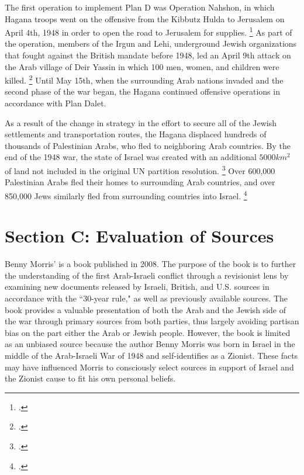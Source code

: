 \documentclass[12pt]{turabian-researchpaper}
\begin{document}
The first operation to implement Plan D was Operation Nahshon, in which Hagana troops went on the offensive from the Kibbutz Hulda to Jerusalem on April 4th, 1948 in order to open the road to Jerusalem for supplies.
\footcite[][121]{morris}
As part of the operation, members of the Irgun and Lehi, underground Jewish organizations that fought against the British mandate before 1948, led an April 9th attack on the Arab village of Deir Yassin in which 100 men, women, and children were killed.
\footcite{nabka}
Until May 15th, when the surrounding Arab nations invaded and the second phase of the war began, the Hagana continued offensive operations in accordance with Plan Dalet.



As a result of the change in strategy in the effort to secure all of the Jewish settlements and transportation routes, the Hagana displaced hundreds of thousands of Palestinian Arabs, who fled to neighboring Arab countries.  By the end of the 1948 war, the state of Israel was created with an additional $5000km^2$ of land not included in the original UN partition resolution.
\footcite{lorch}
Over 600,000 Palestinian Arabs fled their homes to surrounding Arab countries, and over 850,000 Jews similarly fled from surrounding countries into Israel.
\footcite{bartal}

\pagebreak
\section{Section C: Evaluation of Sources}
\noindent {}



Benny Morris'  is a book published in 2008.  The purpose of the book is to further the understanding of the first Arab-Israeli conflict through a revisionist lens by examining new documents released by Israeli, British, and U.S. sources in accordance with the ``30-year rule," as well as previously available sources.  The book provides a valuable presentation of both the Arab and the Jewish side of the war through primary sources from both parties, thus largely avoiding partisan bias on the part either the Arab or Jewish people.  However, the book is limited as an unbiased source because the author Benny Morris was born in Israel in the middle of the Arab-Israeli War of 1948 and self-identifies as a Zionist.  These facts may have influenced Morris to consciously select sources in support of Israel and the Zionist cause to fit his own personal beliefs.
\end{document}
